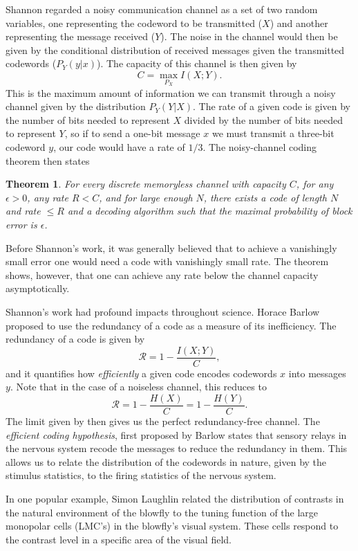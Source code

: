 Shannon regarded a noisy communication channel as a set of two random variables, one representing the codeword to be transmitted ($X$) and another representing the message received ($Y$). The noise in the channel would then be given by the conditional distribution of received messages given the transmitted codewords ($P_Y(y|x)$). The capacity of this channel is then given by
$$
C = \max_{P_X} I(X;Y).
$$
This is the maximum amount of information we can transmit through a noisy channel given by the distribution $P_Y(Y|X)$.
The rate of a given code is given by the number of bits needed to represent $X$ divided by the number of bits needed to represent $Y$, so if to send a one-bit message $x$ we must transmit a three-bit codeword $y$, our code would have a rate of $1/3$.
The noisy-channel coding theorem\cite{mackay2003information} then states
\newtheorem{noisychannel}{Theorem}
\begin{noisychannel}
\label{thm:noisychannel}
For every discrete memoryless channel with capacity $C$, for any $\epsilon>0$, any rate $R<C$, and for large enough $N$, there exists a code of length $N$ and rate $\leq R$ and a decoding algorithm such that the maximal probability of block error is $\epsilon$.
\end{noisychannel}
Before Shannon's work, it was generally believed that to achieve a vanishingly small error one would need a code with vanishingly small rate. The theorem shows, however, that one can achieve any rate below the channel capacity asymptotically.\par
Shannon's work had profound impacts throughout science. Horace Barlow proposed to use the redundancy of a code as a measure of its inefficiency. The redundancy of a code is given by
$$
\mathcal{R} = 1 - \frac{I(X;Y)}{C},
$$
and it quantifies how {\em efficiently} a given code encodes codewords $x$ into messages $y$. Note that in the case of a noiseless channel, this reduces to 
$$
\mathcal{R} = 1 - \frac{H(X)}{C}= 1 - \frac{H(Y)}{C}.
$$
The limit given by  then gives us the perfect redundancy-free channel. The {\em efficient coding hypothesis}, first proposed by Barlow\cite{Barlow1961} states that sensory relays in the nervous system recode the	messages to reduce the redundancy in them. This allows us to relate the distribution of the codewords in nature, given by the stimulus statistics, to the firing statistics of the nervous system.\par
In one popular example, Simon Laughlin related the distribution of contrasts in the natural environment of the blowfly to the tuning function of the large monopolar cells (LMC's) in the blowfly's visual system\cite{Laughlin1981}. These cells respond to the contrast level in a specific area of the visual field.
